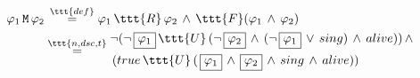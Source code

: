 \documentclass[11pt]{article}
\begin{document}
$\begin{aligned}
      \varphi_1\,\tt{M}\,\varphi_2 &\,\overset{\ttt{def}}{=} \varphi_1\,\ttt{R}\,\varphi_2\,\land\,\ttt{F}(\varphi_1\,\land\,\varphi_2) \\
      &\overset{\ttt{n,dsc,t}}{=} \begin{aligned}
                                       &\neg(\neg\,\boxed{\varphi_1}\,\ttt{U}\,(\neg\,\boxed{\varphi_2}\,\land\,(\neg\,\boxed{\varphi_1}\,\lor\,sing)\,\land\,alive))\,\land\\
                                       &\,(true\,\ttt{U}\,(\,\boxed{\varphi_1}\,\land\,\boxed{\varphi_2}\,\land\,sing\,\land\,alive))
      \end{aligned}
\end{aligned}$
\end{document}
